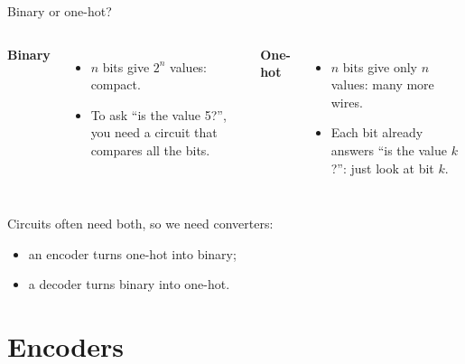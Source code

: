 \documentclass[10pt]{wosm-slides}
\begin{document}
\begin{frame}{Binary or one-hot?}
  \begin{columns}[T, totalwidth=\textwidth]
      \textbf{Binary}
      \begin{itemize}
        \item $n$ bits give $2^n$ values: compact.
        \item To ask \enquote{is the value 5?}, you need a circuit that compares all
          the bits.
      \end{itemize}
      \textbf{One-hot}
      \begin{itemize}
        \item $n$ bits give only $n$ values: many more wires.
        \item Each bit already answers \enquote{is the value $k$?}: just look at bit
          $k$.
      \end{itemize}
  \end{columns}

  \bigskip
  Circuits often need both, so we need converters:
  \begin{itemize}
    \item an \alert{encoder} turns one-hot into binary;
    \item a \alert{decoder} turns binary into one-hot.
  \end{itemize}

  \medskip
\end{frame}

\section{Encoders}
\end{document}
